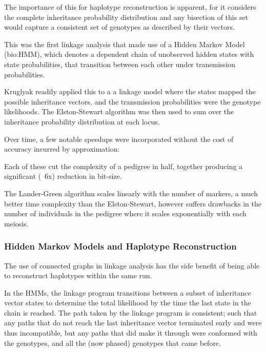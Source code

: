 The importance of this for haplotype reconstruction is apparent, for it considers the complete inheritance probability distribution and any bisection of this set would capture a consistent set of genotypes as described by their vectors.

This was the first linkage analysis that made use of a Hidden Markov Model (\gls{bio:HMM}),  which denotes a dependent chain of unobserved hidden states with state probabilities, that transition between each other under transmission probabilities.  

Kruglyak readily applied this to a a linkage model where the states mapped the possible inheritance vectors, and the transmission probabilities were the genotype likelihoods. The Elston-Stewart algorithm was then used to sum over the inheritance probability distribution at each locus.

Over time, a few notable speedups were incorporated without the cost of accuracy incurred by approximation:

\begin{description}
\end{description}

Each of these cut the complexity of a pedigree in half, together producing a significant (~6x) reduction in bit-size.

The Lander-Green algorithm scales linearly with the number of markers, a much better time complexity than the Elston-Stewart, however suffers drawbacks in the number of individuals in the pedigree where it scales exponentially with each meiosis.


\subsubsection{Hidden Markov Models and Haplotype Reconstruction}

The use of connected graphs in linkage analysis has the side benefit of being able to reconstruct haplotypes within the same run.

In the HMMs, the linkage program transitions between a subset of inheritance vector states to determine the total likelihood by the time the last state in the chain is reached. The path taken by the linkage program is consistent; such that any paths that do not reach the last inheritance vector terminated early and were thus incompatible, but any paths that did make it through were conformed with the genotypes, and all the (now phased) genotypes that came before.


